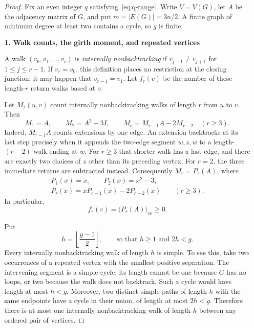\documentclass[11pt,a4paper]{article}
\newcommand{\proofstep}[1]{%
  \par\addvspace{1.0\baselineskip}%
  \noindent\textbf{#1}\par\nobreak\smallskip\noindent\ignorespaces}
\begin{document}
\begin{proof}
Fix an even integer $q$ satisfying~\eqref{eq:q-range}.
Write $V=V(G)$, let $A$ be the adjacency matrix of $G$, and put
$m=|E(G)|=3n/2$. A finite graph of minimum degree at least two contains
a cycle, so $g$ is finite.

\proofstep{1. Walk counts, the girth moment, and repeated vertices}
A walk $(v_0,v_1,\ldots,v_r)$ is \emph{internally nonbacktracking} if
$v_{j-1}\ne v_{j+1}$ for $1\le j\le r-1$. If $v_r=v_0$, this definition
places no restriction at the closing junction: it may happen that
$v_{r-1}=v_1$. Let $f_r(v)$ be the number of these length-$r$ return walks
based at $v$.

Let $M_r(u,v)$ count internally nonbacktracking walks of length $r$ from
$u$ to $v$. Then
\[
 M_1=A,\qquad M_2=A^2-3I,
 \qquad M_r=M_{r-1}A-2M_{r-2}\quad(r\ge3).
\]
Indeed, $M_{r-1}A$ counts extensions by one edge. An extension backtracks
at its last step precisely when it appends the two-edge segment $w,z,w$
to a length-$(r-2)$ walk ending at $w$. For $r\ge3$ that shorter walk has a last edge, and
there are exactly two choices of $z$ other than its preceding vertex.
For $r=2$, the three immediate returns are subtracted instead.
Consequently $M_r=P_r(A)$, where
\begin{equation}\label{eq:polynomials}
 \begin{gathered}
 P_1(x)=x,\qquad P_2(x)=x^2-3,\\
 P_r(x)=xP_{r-1}(x)-2P_{r-2}(x)\qquad(r\ge3).
 \end{gathered}
\end{equation}
In particular,
\begin{equation}\label{eq:fr}
 f_r(v)=\bigl(P_r(A)\bigr)_{vv}\ge0.
\end{equation}

Put
\begin{equation}\label{eq:h}
 h=\left\lfloor\frac{g-1}{2}\right\rfloor,
 \qquad\text{so that }h\ge1\text{ and }2h<g.
\end{equation}
Every internally nonbacktracking walk of length $h$ is simple. To see
this, take two occurrences of a repeated vertex with the smallest
positive separation. The intervening segment is a simple cycle:
its length cannot be one because $G$ has no loops, or two because the
walk does not backtrack. Such a cycle would have length at most $h<g$.
Moreover, two distinct simple paths of length $h$ with the same
endpoints have a cycle in their union, of length at most $2h<g$.
Therefore there is at most one internally nonbacktracking walk of length
$h$ between any ordered pair of vertices.


\end{proof}
\end{document}
